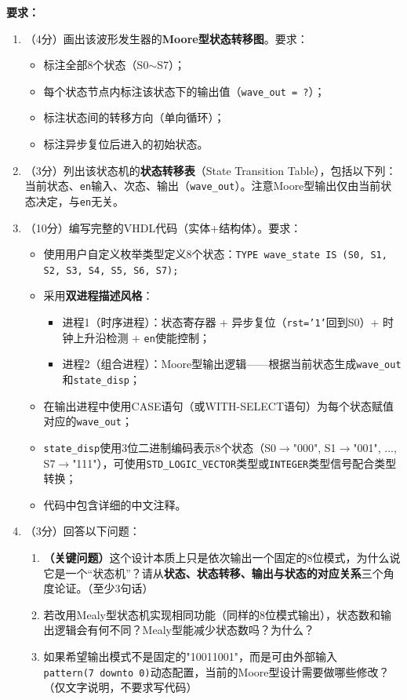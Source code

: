 \textbf{要求：}
\begin{enumerate}[label=(\arabic*)]
  \item （4分）画出该波形发生器的\textbf{Moore型状态转移图}。要求：
  \begin{itemize}
    \item 标注全部8个状态（S0$\sim$S7）；
    \item 每个状态节点内标注该状态下的输出值（\texttt{wave\_out = ?}）；
    \item 标注状态间的转移方向（单向循环）；
    \item 标注异步复位后进入的初始状态。
  \end{itemize}
  \item （3分）列出该状态机的\textbf{状态转移表}（State Transition Table），包括以下列：当前状态、\texttt{en}输入、次态、输出（\texttt{wave\_out}）。注意Moore型输出仅由当前状态决定，与\texttt{en}无关。
  \item （10分）编写完整的VHDL代码（实体+结构体）。要求：
  \begin{itemize}
    \item 使用用户自定义枚举类型定义8个状态：\texttt{TYPE wave\_state IS (S0, S1, S2, S3, S4, S5, S6, S7);}
    \item 采用\textbf{双进程描述风格}：
    \begin{itemize}
      \item 进程1（时序进程）：状态寄存器 + 异步复位（\texttt{rst='1'}回到S0）+ 时钟上升沿检测 + \texttt{en}使能控制；
      \item 进程2（组合进程）：Moore型输出逻辑——根据当前状态生成\texttt{wave\_out}和\texttt{state\_disp}；
    \end{itemize}
    \item 在输出进程中使用CASE语句（或WITH-SELECT语句）为每个状态赋值对应的\texttt{wave\_out}；
    \item \texttt{state\_disp}使用3位二进制编码表示8个状态（S0$\to$"000", S1$\to$"001", ..., S7$\to$"111"），可使用\texttt{STD\_LOGIC\_VECTOR}类型或\texttt{INTEGER}类型信号配合类型转换；
    \item 代码中包含详细的中文注释。
  \end{itemize}
  \item （3分）回答以下问题：
  \begin{enumerate}
    \item \textbf{（关键问题）}这个设计本质上只是依次输出一个固定的8位模式，为什么说它是一个“状态机”？请从\textbf{状态、状态转移、输出与状态的对应关系}三个角度论证。（至少3句话）
    \item 若改用Mealy型状态机实现相同功能（同样的8位模式输出），状态数和输出逻辑会有何不同？Mealy型能减少状态数吗？为什么？
    \item 如果希望输出模式不是固定的"10011001"，而是可由外部输入\texttt{pattern(7~downto~0)}动态配置，当前的Moore型设计需要做哪些修改？（仅文字说明，不要求写代码）
  \end{enumerate}
\end{enumerate}

